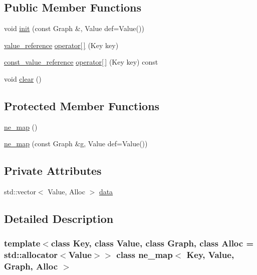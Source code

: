 \subsection*{Public Member Functions}
\begin{DoxyCompactItemize}
\item 
void \mbox{\hyperlink{classne__map_a4ef2ab4aebcb57a7a101975bf6a88e24}{init}} (const Graph \&, Value def=Value())
\item 
\mbox{\hyperlink{classne__map_a3de60750d102f8992a215b0fe645014d}{value\+\_\+reference}} \mbox{\hyperlink{classne__map_a4bcfa7ec2dcbfaa42fab93dfa81e8ab0}{operator\mbox{[}$\,$\mbox{]}}} (Key key)
\item 
\mbox{\hyperlink{classne__map_ad2be1a01de53940aee1282ec0e34f0f7}{const\+\_\+value\+\_\+reference}} \mbox{\hyperlink{classne__map_ad8d23cc924963ddff8267e625dcbffc6}{operator\mbox{[}$\,$\mbox{]}}} (Key key) const
\item 
void \mbox{\hyperlink{classne__map_aebe555c23769c6dcc869b5ac7fae6a9c}{clear}} ()
\end{DoxyCompactItemize}
\subsection*{Protected Member Functions}
\begin{DoxyCompactItemize}
\item 
\mbox{\hyperlink{classne__map_acbe94c2209408e8af27fb9580251f360}{ne\+\_\+map}} ()
\item 
\mbox{\hyperlink{classne__map_a769ee373d4cd8d3ef2c1577372da149c}{ne\+\_\+map}} (const Graph \&\mbox{\hyperlink{rings_8cpp_aa9df5aa3976a89a96a5f1c7611d42938}{g}}, Value def=Value())
\end{DoxyCompactItemize}
\subsection*{Private Attributes}
\begin{DoxyCompactItemize}
\item 
std\+::vector$<$ Value, Alloc $>$ \mbox{\hyperlink{classne__map_af73307678e05a9c24c084d98b267afa8}{data}}
\end{DoxyCompactItemize}


\subsection{Detailed Description}
\subsubsection*{template$<$class Key, class Value, class Graph, class Alloc = std\+::allocator$<$\+Value$>$$>$\newline
class ne\+\_\+map$<$ Key, Value, Graph, Alloc $>$}

